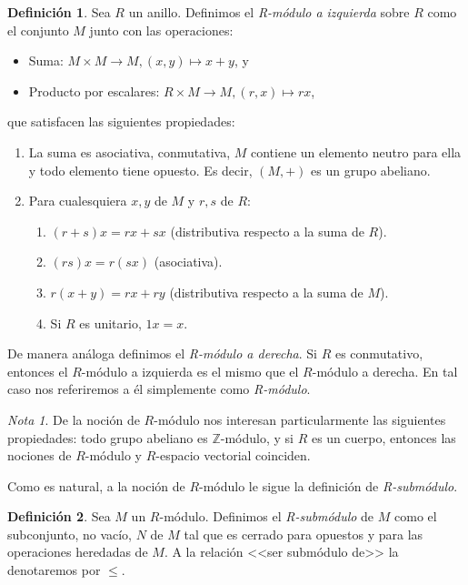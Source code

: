 \documentclass[12pt, a4paper, twoside]{book}
\numberwithin{equation}{section}
\theoremstyle{definition}
\newtheorem{defi}{Definición}[section]
\theoremstyle{remark}
\newtheorem*{remark}{Nota}
\theoremstyle{plain}
\begin{document}
	\begin{defi}
		Sea $R$ un anillo. Definimos el \textit{R-módulo a izquierda} 
		sobre
		$R$ como el conjunto $M$ junto con las operaciones:
		\begin{itemize}
			\item Suma: $M \times M \rightarrow M, (x,y) \mapsto 
				x+y$, y
			\item Producto por escalares: $R \times M \rightarrow 
				M, (r,x) \mapsto rx$,	
		\end{itemize}
		que satisfacen las siguientes propiedades:
		\begin{enumerate}
			\item La suma es asociativa, conmutativa, $M$ contiene
			      un elemento neutro para ella y todo elemento 
			      tiene opuesto. Es decir, $(M,+)$ es un grupo 
			      abeliano.
		      \item Para cualesquiera $x,y$ de $M$ y $r,s$ de $R$: 
		      	\begin{enumerate}
			 	\item $(r+s)x=rx+sx$ (distributiva respecto a 
					la suma de $R$).
				\item $(rs)x=r(sx)$ (asociativa).
				\item $r(x+y)=rx+ry$ (distributiva respecto a 
					la suma de $M$).
				\item Si $R$ es unitario, $1x=x$.	
			\end{enumerate}
		\end{enumerate}
		De manera análoga definimos el \textit{R-módulo a derecha}. Si 
		$R$ es conmutativo, entonces el $R$-módulo a izquierda es el 
		mismo que el $R$-módulo a derecha. En tal caso nos referiremos 
		a
		él simplemente como \textit{R-módulo}.
	\end{defi}

	\begin{remark}
	De la noción de $R$-módulo nos interesan particularmente las 
	siguientes propiedades: todo grupo abeliano es $\mathbb{Z}$-módulo, y
	si $R$ es un cuerpo, entonces las nociones de $R$-módulo y $R$-espacio
	vectorial coinciden.
	\end{remark}

	Como es natural, a la noción de $R$-módulo le sigue la definición de
	\emph{R-submódulo}.

	\begin{defi}
	Sea $M$ un $R$-módulo. Definimos el \textit{R-submódulo} de $M$ como 
	el subconjunto, no vacío, $N$ de $M$ tal que es cerrado para opuestos 
	y para las operaciones heredadas de $M$. A la relación <<ser submódulo 
	de>> la denotaremos por $\leq$.
	\end{defi}
\end{document}
